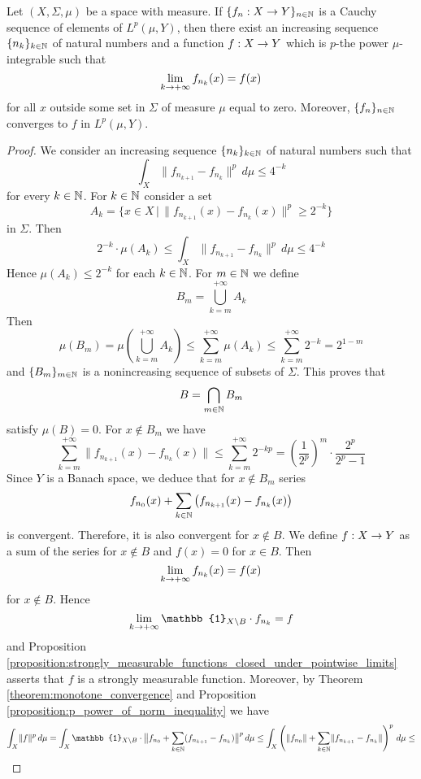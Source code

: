 \begin{theorem}[Riesz]\label{theorem:riesz_theorem}
    Let $(X,\Sigma,\mu)$ be a space with measure. If $\{f_n:X\rightarrow Y\}_{n\in {\mathbb N}}$ is a Cauchy sequence of elements of $L^p(\mu,Y)$, then there exist an increasing sequence $\{n_k\}_{k\in {\mathbb N}}$ of natural numbers and a function $f:X\rightarrow Y$ which is $p$-the power $\mu$-integrable such that
    $$\lim_{k\rightarrow +\infty}f_{n_k}(x) = f(x)$$
    for all $x$ outside some set in $\Sigma$ of measure $\mu$ equal to zero. Moreover, $\{f_n\}_{n\in {\mathbb N}}$ converges to $f$ in $L^p(\mu,Y)$.
\end{theorem}
\begin{proof}
    We consider an increasing sequence $\{n_k\}_{k\in {\mathbb N}}$ of natural numbers such that
    $$\int_X\lVert f_{n_{k+1}} - f_{n_k}\rVert^p\,d\mu \leq 4^{-k}$$
    for every $k\in {\mathbb N}$. For $k\in {\mathbb N}$ consider a set
    $$A_k = \big\{x \in X\,\big|\,\lVert f_{n_{k+1}}(x) - f_{n_k}(x)\rVert^p \geq 2^{-k}\big\}$$
    in $\Sigma$. Then
    $$2^{-k} \cdot \mu(A_k)\leq \int_X\lVert f_{n_{k+1}}-f_{n_k}\rVert^p \,d\mu \leq 4^{-k}$$
    Hence $\mu(A_k)\leq 2^{-k}$ for each $k\in {\mathbb N}$. For $m\in {\mathbb N}$ we define
    $$B_m = \bigcup_{k=m}^{+\infty}A_k$$
    Then
    $$\mu(B_m) = \mu\left(\bigcup_{k=m}^{+\infty}A_k\right) \leq \sum_{k = m}^{+\infty}\mu(A_k) \leq \sum_{k=m}^{+\infty}2^{-k} = 2^{1 - m}$$
    and $\{B_m\}_{m\in {\mathbb N}}$ is a nonincreasing sequence of subsets of $\Sigma$. This proves that
    $$B = \bigcap_{m\in {\mathbb N}}B_m$$
    satisfy $\mu(B) = 0$. For $x\not \in B_m$ we have
    $$\sum_{k = m}^{+\infty}\lVert f_{n_{k+1}}(x) - f_{n_k}(x)\rVert \leq \sum_{k=m}^{+\infty}2^{-kp} = \left(\frac{1}{2^p}\right)^m\cdot \frac{2^p}{2^p - 1}$$
    Since $Y$ is a Banach space, we deduce that for $x\not \in B_m$ series
    $$f_{n_0}(x) + \sum_{k\in {\mathbb N}}\left(f_{n_{k+1}}(x) - f_{n_k}(x)\right)$$
    is convergent. Therefore, it is also convergent for $x\not \in B$. We define $f:X\rightarrow Y$ as a sum of the series for $x\not \in B$ and $f(x) = 0$ for $x\in B$. Then
    $$\lim_{k\rightarrow +\infty}f_{n_k}(x) = f(x)$$
    for $x \not \in B$. Hence
    $$\lim_{k\ra +\infty}\mathbb{1}_{X\setminus B}\cdot f_{n_k} = f$$
    and Proposition \ref{proposition:strongly_measurable_functions_closed_under_pointwise_limits} asserts that $f$ is a strongly measurable function. Moreover, by Theorem \ref{theorem:monotone_convergence} and Proposition
    \ref{proposition:p_power_of_norm_inequality} we have
    $$\int_X\lVert f\rVert^p \,d\mu = \int_X\mathbb{1}_{X\setminus B}\cdot \big \lVert f_{n_0} + \sum_{k\in \NN}(f_{n_{k+1}} - f_{n_k})\big \rVert^p \,d\mu \leq \int_X\left(\lVert f_{n_0}\rVert  + \sum_{k\in \NN}\lVert f_{n_{k+1}}-f_{n_k}\rVert \right)^p\,d\mu \leq $$

\end{proof}
